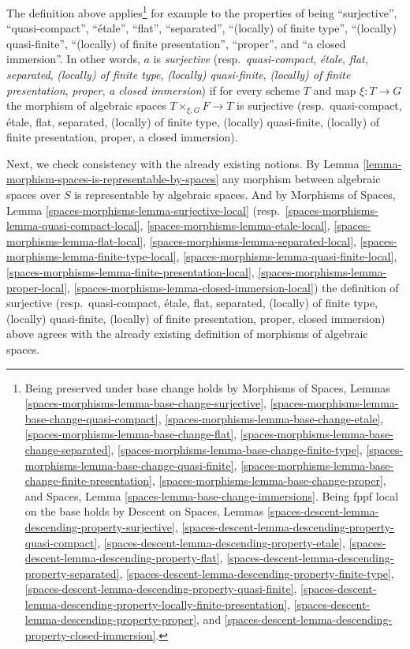 \medskip\noindent
The definition above applies\footnote{Being preserved under base
change holds by
Morphisms of Spaces, Lemmas
\ref{spaces-morphisms-lemma-base-change-surjective},
\ref{spaces-morphisms-lemma-base-change-quasi-compact},
\ref{spaces-morphisms-lemma-base-change-etale},
\ref{spaces-morphisms-lemma-base-change-flat},
\ref{spaces-morphisms-lemma-base-change-separated},
\ref{spaces-morphisms-lemma-base-change-finite-type},
\ref{spaces-morphisms-lemma-base-change-quasi-finite},
\ref{spaces-morphisms-lemma-base-change-finite-presentation},
\ref{spaces-morphisms-lemma-base-change-proper}, and
Spaces, Lemma
\ref{spaces-lemma-base-change-immersions}.
Being fppf local on the base holds by
Descent on Spaces, Lemmas
\ref{spaces-descent-lemma-descending-property-surjective},
\ref{spaces-descent-lemma-descending-property-quasi-compact},
\ref{spaces-descent-lemma-descending-property-etale},
\ref{spaces-descent-lemma-descending-property-flat},
\ref{spaces-descent-lemma-descending-property-separated},
\ref{spaces-descent-lemma-descending-property-finite-type},
\ref{spaces-descent-lemma-descending-property-quasi-finite},
\ref{spaces-descent-lemma-descending-property-locally-finite-presentation},
\ref{spaces-descent-lemma-descending-property-proper}, and
\ref{spaces-descent-lemma-descending-property-closed-immersion}.
}
for example to the properties of being
``surjective'',
``quasi-compact'',
``\'etale'',
``flat'',
``separated'',
``(locally) of finite type'',
``(locally) quasi-finite'',
``(locally) of finite presentation'',
``proper'', and
``a closed immersion''.
In other words, $a$ is
{\it surjective}
(resp.\ {\it quasi-compact},
{\it \'etale},
{\it flat},
{\it separated},
{\it (locally) of finite type},
{\it (locally) quasi-finite},
{\it (locally) of finite presentation},
{\it proper},
{\it a closed immersion})
if for every scheme $T$ and map $\xi : T \to G$
the morphism of algebraic spaces $T \times_{\xi, G} F \to T$ is
surjective
(resp.\ quasi-compact,
\'etale,
flat,
separated,
(locally) of finite type,
(locally) quasi-finite,
(locally) of finite presentation,
proper,
a closed immersion).

\medskip\noindent
Next, we check consistency with the already existing notions. By
Lemma \ref{lemma-morphism-spaces-is-representable-by-spaces}
any morphism between algebraic spaces over $S$ is representable by
algebraic spaces. And by
Morphisms of Spaces,
Lemma \ref{spaces-morphisms-lemma-surjective-local}
(resp.\ \ref{spaces-morphisms-lemma-quasi-compact-local},
\ref{spaces-morphisms-lemma-etale-local},
\ref{spaces-morphisms-lemma-flat-local},
\ref{spaces-morphisms-lemma-separated-local},
\ref{spaces-morphisms-lemma-finite-type-local},
\ref{spaces-morphisms-lemma-quasi-finite-local},
\ref{spaces-morphisms-lemma-finite-presentation-local},
\ref{spaces-morphisms-lemma-proper-local},
\ref{spaces-morphisms-lemma-closed-immersion-local})
the definition of
surjective
(resp.\ quasi-compact,
\'etale,
flat,
separated,
(locally) of finite type,
(locally) quasi-finite,
(locally) of finite presentation,
proper,
closed immersion)
above agrees with the already existing definition of morphisms
of algebraic spaces.

